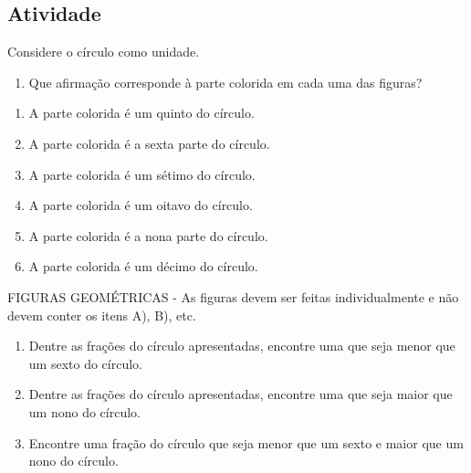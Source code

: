 \documentclass[a4,12pt]{book}
\begin{document}
\subsection{Atividade}







Considere o círculo como unidade. 
\begin{enumerate} [\quad a)] %
  \item      Que afirmação corresponde à parte colorida em cada uma das figuras?  
\end{enumerate} %
\mbox{} \newline 
\begin{enumerate} [\quad a)] %
  \item    	A parte colorida é um quinto do círculo.
  \item    	A parte colorida é a sexta parte do círculo.
  \item    	A parte colorida é um sétimo do círculo.
  \item    	A parte colorida é um oitavo do círculo.
  \item    	A parte colorida é a nona parte do círculo.
  \item    	A parte colorida é um décimo do círculo.
\end{enumerate} %
\mbox{} \newline  \begin{imagem*}[breakable]{}{}   FIGURAS GEOMÉTRICAS - As figuras devem ser feitas individualmente e não devem conter os itens A), B), etc.  
\end{imagem*}\mbox{} \newline 
\begin{enumerate} [\quad a)] %
  \item     Dentre as frações do círculo apresentadas, encontre uma que seja menor que um sexto do círculo.
  \item     Dentre as frações do círculo apresentadas, encontre uma que seja maior que um nono do círculo.
  \item     Encontre uma fração do círculo que seja menor que um sexto e maior que um nono do círculo.
\end{enumerate} %
\end{document}
